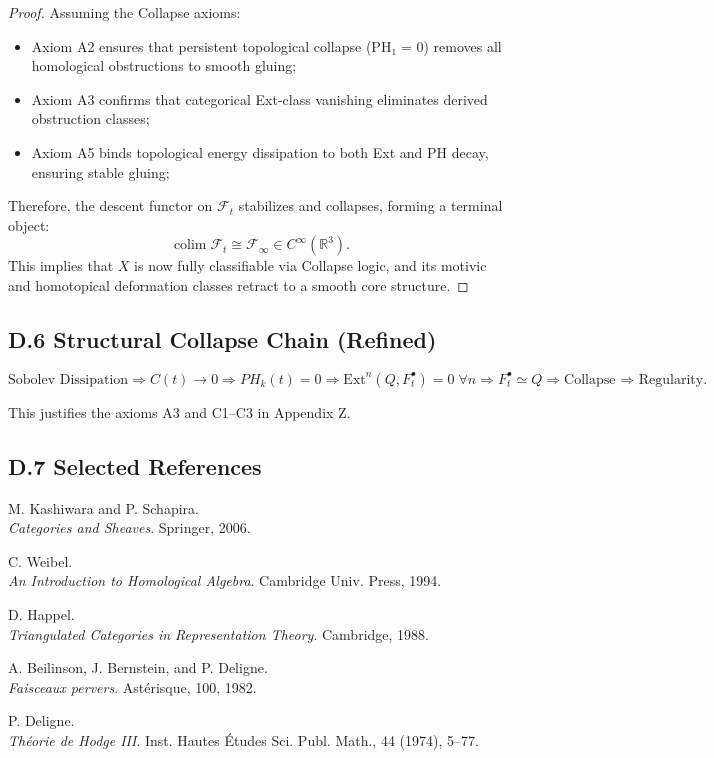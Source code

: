 \documentclass[11pt]{article}
\DeclareMathOperator{\colim}{colim}
\begin{document}
\begin{proof}
Assuming the Collapse axioms:
\begin{itemize}
  \item[\textbullet] Axiom A2 ensures that persistent topological collapse (PH₁ = 0) removes all homological obstructions to smooth gluing;
  \item[\textbullet] Axiom A3 confirms that categorical Ext-class vanishing eliminates derived obstruction classes;
  \item[\textbullet] Axiom A5 binds topological energy dissipation to both Ext and PH decay, ensuring stable gluing;
\end{itemize}
Therefore, the descent functor on \( \mathcal{F}_t \) stabilizes and collapses, forming a terminal object:
\[
\colim \mathcal{F}_t \cong \mathcal{F}_\infty \in C^\infty(\mathbb{R}^3).
\]
This implies that \( X \) is now fully classifiable via Collapse logic, and its motivic and homotopical deformation classes retract to a smooth core structure.  
\end{proof}


\subsection*{D.6 Structural Collapse Chain (Refined)}

\[
\text{Sobolev Dissipation}
\Rightarrow
C(t) \to 0
\Rightarrow
PH_k(t) = 0
\Rightarrow
\mathrm{Ext}^n(Q, F^\bullet_t) = 0 \; \forall n
\Rightarrow
F^\bullet_t \simeq Q
\Rightarrow
\text{Collapse ⇒ Regularity}.
\]

This justifies the axioms A3 and C1–C3 in Appendix Z.

\subsection*{D.7 Selected References}

\begin{thebibliography}{9}

M. Kashiwara and P. Schapira.\\
\textit{Categories and Sheaves}. Springer, 2006.

C. Weibel.\\
\textit{An Introduction to Homological Algebra}. Cambridge Univ. Press, 1994.

D. Happel.\\
\textit{Triangulated Categories in Representation Theory}. Cambridge, 1988.

A. Beilinson, J. Bernstein, and P. Deligne.\\
\textit{Faisceaux pervers}. Astérisque, 100, 1982.

P. Deligne.\\
\textit{Théorie de Hodge III}. Inst. Hautes Études Sci. Publ. Math., 44 (1974), 5–77.

\end{thebibliography}
\end{document}
